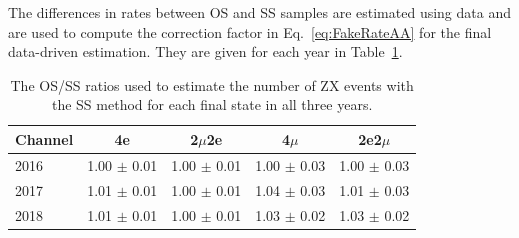 The differences in rates between OS and SS samples are estimated using data and are used to compute 
the correction factor in Eq.~\ref{eq:FakeRateAA} for the final data-driven estimation. 
They are given for each year in Table~\ref{tab:OSSS}.

\begin{table}[!htb]
\begin{center}
    \begin{tabular}{ | l | c | c | c |  c | }  \hline
   Channel  &  4e               &  2$\mu$2e          &  4$\mu$           &  2e2$\mu$        \\ \hline \hline   
   2016     &  1.00 $\pm$ 0.01  &  1.00 $\pm$ 0.01   &  1.00 $\pm$ 0.03  &  1.00 $\pm$ 0.03 \\ 
   2017     &  1.01 $\pm$ 0.01  &  1.00 $\pm$ 0.01   &  1.04 $\pm$ 0.03  &  1.01 $\pm$ 0.03 \\ 
   2018     &  1.01 $\pm$ 0.01  &  1.00 $\pm$ 0.01   &  1.03 $\pm$ 0.02  &  1.03 $\pm$ 0.02 \\ \hline
    \end{tabular}
    \caption{ The OS/SS ratios used to estimate the number of ZX events with the SS method for each final state in all three years. }
    \label{tab:OSSS}
\end{center}
\end{table}

